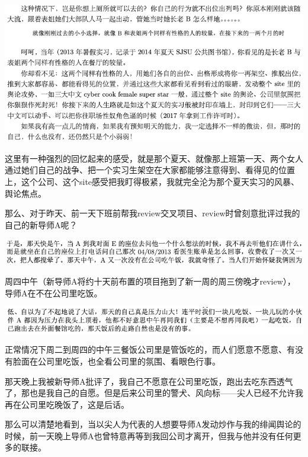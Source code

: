 \documentclass[9pt, b5paper]{article}
\begin{document}
\begin{center}
\includegraphics[width=.9\linewidth]{./pic/backups_plans_20210512_112652.png}
\end{center}

这里有一种强烈的回忆起来的感受，就是那个夏天、就像那上班第一天、两个女人通过她们自己的战争、把一个实习生架空在大家都能够注意得到、看得见的位置上，这个公司、这个site感受把我盯得极紧，我就完全沦为那个夏天实习的风暴、舆论焦点。

那么、对于昨天、前一天下班前帮我review交叉项目、review时曾刻意批评过我的自己的新导师A呢？

\begin{center}
\includegraphics[width=.9\linewidth]{./pic/backups_plans_20210512_114515.png}
\end{center}

周四中午（新导师A将约十天前布置的项目拖到了新一周的周三傍晚才review），导师A在不在公司里吃饭。

\begin{center}
\includegraphics[width=.9\linewidth]{./pic/backups_plans_20210512_113036.png}
\end{center}

正常情况下周二到周四的中午三餐饭公司里是管饭吃的，而人们愿意不愿意、有没有脸面在公司里吃饭，也全看公司里的氛围、看眼色行事。 

那天晚上我被新导师A批评了，我自己不愿意在公司里吃饭，跑出去吃东西透气了，那也是我自己的自愿。但是后来公司里的警犬、风向标——尖人已经不允许我再在公司里吃晚饭了，这是后话。 

那么可以清楚地看到，当以尖人为代表的人想要导师A发动炒作与我的绯闻舆论的时候，前一天晚上导师A也曾特意再等到我回公司才离开，但我与他并没有任何更多的联接。
\end{document}
